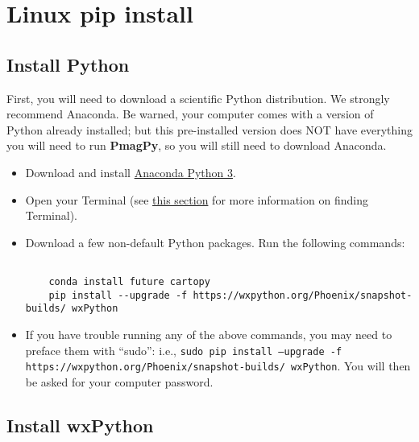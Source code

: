 \documentclass[11pt]{article}
\begin{document}
\tableofcontents


\section{Linux pip install}

\subsection{Install Python}

First, you will need to download a scientific Python distribution.  We strongly recommend Anaconda.  Be warned, your computer comes with a version of Python already installed; but this pre-installed version does NOT have everything you will need to run {\bf PmagPy}, so you will still need to download Anaconda.

\begin{itemize}
   \item Download and install \href{https://www.anaconda.com/download}{Anaconda Python 3}.
   \item Open your Terminal (see \href{https://earthref.org/PmagPy/cookbook/#command_line}{this section} for more information on finding Terminal).
   \item Download a few non-default Python packages.  Run the following commands: \begin{verbatim}

    conda install future cartopy
    pip install --upgrade -f https://wxpython.org/Phoenix/snapshot-builds/ wxPython
\end{verbatim}


\item If you have trouble running any of the above commands, you may need to preface them with ``sudo'': i.e., \texttt{sudo pip install --upgrade -f https://wxpython.org/Phoenix/snapshot-builds/ wxPython}.  You will then be asked for your computer password.

  \end{itemize}


\subsection{Install wxPython}
\end{document}
